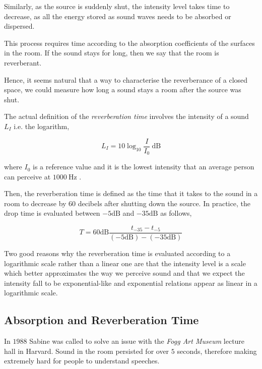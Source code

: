 \documentclass[a4paper]{article}
\begin{document}
Similarly, as the source is suddenly shut, the intensity level takes time to decrease, as all the energy stored as sound waves needs to be absorbed or dispersed. 

This process requires time according to the absorption coefficients of the surfaces in the room. If the sound stays for long, then we say that the room is reverberant.

Hence, it seems natural that a way to characterise the reverberance of a closed space, we could measure how long a sound stays a room after the source was shut.

The actual definition of the \textit{reverberation time} involves the intensity of a sound $L_I$ i.e. the logarithm,

\begin{equation}
L_I = 10 \log_{10}{\frac{I}{I_0}}\ \mathrm{dB}
\end{equation}

where $I_0$ is a reference value and it is the lowest intensity that an average person can perceive at $1000\ \mathrm{Hz}$ \cite{book:acoustic2}.

Then, the reverberation time is defined as the time that it takes to the sound in a room to decrease by $60$ decibels after shutting down the source. In practice, the drop time is evaluated between $-5 \mathrm{dB}$ and $-35 \mathrm{dB}$ as follows,

\begin{equation}
T = 60 \mathrm{dB} \frac{t_{-35} - t_{-5}}{(-5\mathrm{dB}) - (-35\mathrm{dB})}
\end{equation}

Two good reasons why the reverberation time is evaluated according to a logarithmic scale rather than a linear one are that the intensity level is a scale which better approximates the way we perceive sound \cite{book:acoustic2} and that we expect the intensity fall to be exponential-like \cite{book:acoustic} and exponential relations appear as linear in a logarithmic scale.

\subsection{Absorption and Reverberation Time\label{sub:absorption}}

In $1988$ Sabine was called to solve an issue with the \textit{Fogg Art Museum} lecture hall in Harvard. Sound in the room persisted for over $5$ seconds, therefore making extremely hard for people to understand speeches.
\end{document}
